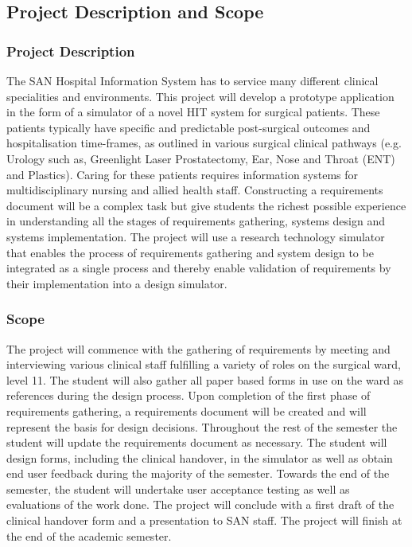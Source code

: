 \subsection{Project Description and Scope}
\subsubsection{Project Description}
The SAN Hospital Information System has to service many different clinical specialities and environments. This project will develop a prototype application in the form of a simulator of a novel HIT system for surgical patients. These patients typically have specific and predictable post-surgical outcomes and hospitalisation time-frames, as outlined in various surgical clinical pathways (e.g. Urology such as, Greenlight Laser Prostatectomy, Ear, Nose and Throat (ENT) and Plastics). Caring for these patients requires information systems for multidisciplinary nursing and allied health staff.
Constructing a requirements document will be a complex task but give students the richest possible experience in understanding all the stages of requirements gathering, systems design and systems implementation. The project will use a research technology simulator that enables the process of requirements gathering and system design to be integrated as a single process and thereby enable validation of requirements by their implementation into a design simulator. 

\subsubsection{Scope}
The project will commence with the gathering of requirements by meeting and interviewing various clinical staff fulfilling a variety of roles on the surgical ward, level 11. The student will also gather all paper based forms in use on the ward as references during the design process. Upon completion of the first phase of requirements gathering, a requirements document will be created and will represent the basis for design decisions. Throughout the rest of the semester the student will update the requirements document as necessary. The student will design forms, including the clinical handover, in the simulator as well as obtain end user feedback during the majority of the semester. Towards the end of the semester, the student will undertake user acceptance testing as well as evaluations of the work done. The project will conclude with a first draft of the clinical handover form and a presentation to SAN staff. The project will finish at the end of the academic semester.

